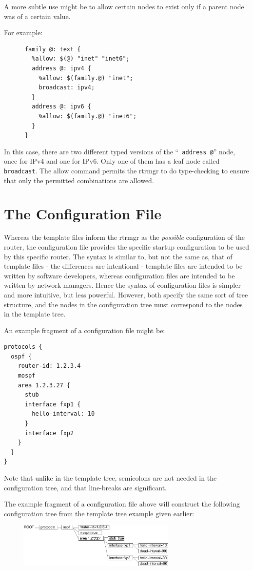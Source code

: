 \documentclass[11pt]{article}
\begin{document}
A more subtle use might be to allow certain nodes to exist only if a
parent node was of a certain value.

For example:
\begin{verbatim}
      family @: text {
        %allow: $(@) "inet" "inet6";
        address @: ipv4 {
          %allow: $(family.@) "inet";
          broadcast: ipv4;
        }
        address @: ipv6 {
          %allow: $(family.@) "inet6";
        }
      }
\end{verbatim}
In this case, there are two different typed versions of the ``{\tt
address @}'' node, once for IPv4 and one for IPv6.  Only one of them has
a leaf node called {\tt broadcast}.  The allow command permits the
rtrmgr to do type-checking to ensure that only the permitted
combinations are allowed.
\newpage
\section{The Configuration File}
Whereas the template files inform the rtrmgr as the {\it possible}
configuration of the router, the configuration file provides the
specific startup configuration to be used by this specific router.
The syntax is similar to, but not the same as, that of template files -
the differences are intentional - template files are intended to be
written by software developers, whereas configuration files are
intended to be written by network managers.  Hence the syntax of
configuration files is simpler and more intuitive, but less powerful.
However, both specify the same sort of tree structure, and the nodes
in the configuration tree must correspond to the nodes in the template
tree.

An example fragment of a configuration file might be:
\begin{verbatim}
protocols {
  ospf {
    router-id: 1.2.3.4
    mospf
    area 1.2.3.27 {
      stub
      interface fxp1 {
        hello-interval: 10
      }
      interface fxp2
    }
  }
}
\end{verbatim}
Note that unlike in the template tree, semicolons are not needed in the
configuration tree, and that line-breaks are significant.

The example fragment of a configuration file above will construct the
following configuration tree from the template tree example given
earlier:
\begin{figure}[htb]
\centerline{\includegraphics[width=0.7\textwidth]{figs/config}}
\vspace{.05in}
\end{figure}
\end{document}
